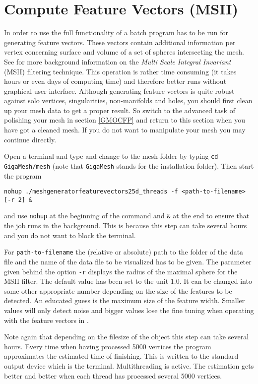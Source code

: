 \chapter{Compute Feature Vectors (MSII)}
\label{feature}
In order to use the full functionality of \GigaMesh 
a batch program has to be run for generating feature vectors. These vectors contain additional information per vertex concerning surface and volume of a set of spheres intersecting the mesh. See \cite{Mara10c} for more background information on the {\em Multi Scale Integral Invariant }(MSII) filtering technique. This operation is rather time consuming (it takes hours or even days of computing time) and therefore better runs without graphical user interface. Although generating feature vectors is quite robust against solo vertices, singularities, non-manifolds and  holes, you should first clean up your mesh data to get a proper result. So switch to the advanced task of polishing your mesh in section \ref{GMOCFP} and return to this section when you have got a cleaned mesh. If you do not want to manipulate your mesh you may continue directly.


Open a terminal and type and change to the mesh-folder by typing {\tt cd GigaMesh/mesh} (note that {\tt GigaMesh} stands for the \GigaMesh installation folder). Then start the program 
\begin{center} 
{\small{\texttt{nohup ./meshgeneratorfeaturevectors25d\_threads -f <path-to-filename> [-r 2] \&} }}
\end{center}
and use {\tt nohup} at the beginning of the command and {\texttt{\&}} at the end to ensure that the job runs in the background. This is because this step can take several hours and you do not want to block the terminal. 

For \texttt{path-to-filename} the (relative or absolute) path to the folder of the data file and the name of the data file to be visualized has to be given. The parameter given behind the option {\tt -r}  displays the radius of the maximal sphere for the MSII filter. The default value has been set to the unit $1.0$.  It  can be changed into some other appropriate number depending on the size of the features to be detected. An educated guess is the maximum size of the feature width. Smaller values will only detect noise and bigger values lose the fine tuning when operating with the feature vectors in \GigaMesh\!\!.

Note again that depending on the filesize of the object this step can take several hours. 
Every time when having processed 5000 vertices the program approximates the estimated time of finishing. This is written to the standard output device which is the terminal. Multithreading is active. The estimation gets better and better when each thread has processed several 5000 vertices.

